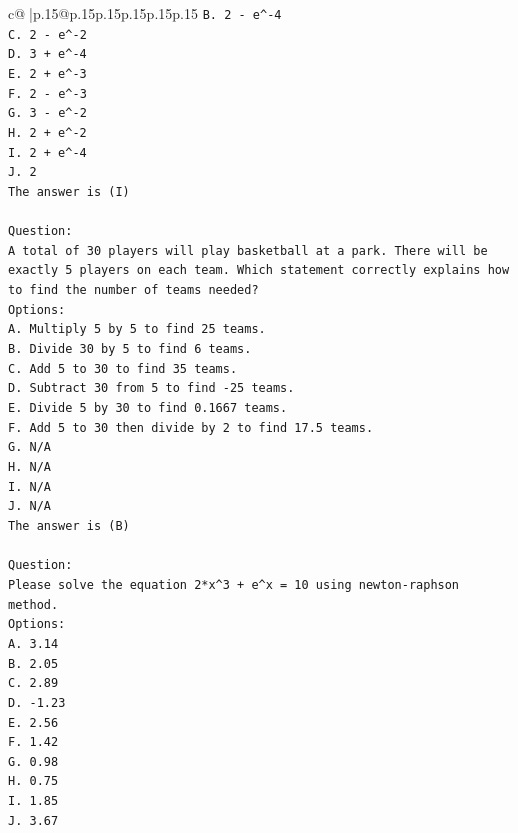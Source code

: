 \documentclass{article}
\begin{document}
{\begin{supertabular}{c@{$\;$}|p{.15\linewidth}@{}p{.15\linewidth}p{.15\linewidth}p{.15\linewidth}p{.15\linewidth}p{.15\linewidth}}
{{{\texttt{B. 2 {-} e\^{}{-}4} \\
\texttt{C. 2 {-} e\^{}{-}2} \\
\texttt{D. 3 + e\^{}{-}4} \\
\texttt{E. 2 + e\^{}{-}3} \\
\texttt{F. 2 {-} e\^{}{-}3} \\
\texttt{G. 3 {-} e\^{}{-}2} \\
\texttt{H. 2 + e\^{}{-}2} \\
\texttt{I. 2 + e\^{}{-}4} \\
\texttt{J. 2} \\
\texttt{The answer is (I)} \\
\\ 
\texttt{Question:} \\
\texttt{A total of 30 players will play basketball at a park. There will be exactly 5 players on each team. Which statement correctly explains how to find the number of teams needed?} \\
\texttt{Options:} \\
\texttt{A. Multiply 5 by 5 to find 25 teams.} \\
\texttt{B. Divide 30 by 5 to find 6 teams.} \\
\texttt{C. Add 5 to 30 to find 35 teams.} \\
\texttt{D. Subtract 30 from 5 to find {-}25 teams.} \\
\texttt{E. Divide 5 by 30 to find 0.1667 teams.} \\
\texttt{F. Add 5 to 30 then divide by 2 to find 17.5 teams.} \\
\texttt{G. N/A} \\
\texttt{H. N/A} \\
\texttt{I. N/A} \\
\texttt{J. N/A} \\
\texttt{The answer is (B)} \\
\\ 
\texttt{Question:} \\
\texttt{Please solve the equation 2*x\^{}3 + e\^{}x = 10 using newton{-}raphson method.} \\
\texttt{Options:} \\
\texttt{A. 3.14} \\
\texttt{B. 2.05} \\
\texttt{C. 2.89} \\
\texttt{D. {-}1.23} \\
\texttt{E. 2.56} \\
\texttt{F. 1.42} \\
\texttt{G. 0.98} \\
\texttt{H. 0.75} \\
\texttt{I. 1.85} \\
\texttt{J. 3.67} \\
            }
        }
    }
     \\ \\


\end{supertabular}}
\end{document}
